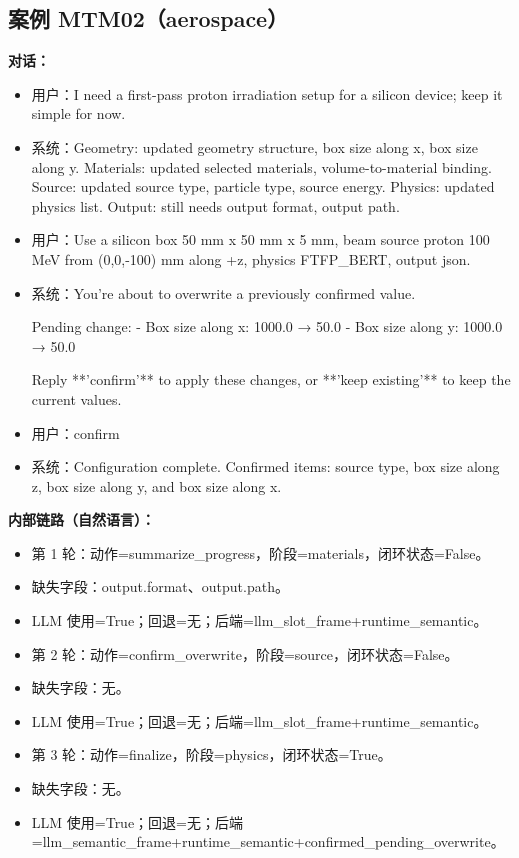 \documentclass[11pt]{ctexart}
\begin{document}
\subsection{案例 MTM02（aerospace）}
\textbf{对话：}
\begin{itemize}
\item 用户：I need a first-pass proton irradiation setup for a silicon device; keep it simple for now.
\item 系统：Geometry: updated geometry structure, box size along x, box size along y. Materials: updated selected materials, volume-to-material binding. Source: updated source type, particle type, source energy. Physics: updated physics list. Output: still needs output format, output path.
\item 用户：Use a silicon box 50 mm x 50 mm x 5 mm, beam source proton 100 MeV from (0,0,-100) mm along +z, physics FTFP\_BERT, output json.
\item 系统：You're about to overwrite a previously confirmed value.

Pending change:
- Box size along x: 1000.0 → 50.0
- Box size along y: 1000.0 → 50.0

Reply **'confirm'** to apply these changes, or **'keep existing'** to keep the current values.
\item 用户：confirm
\item 系统：Configuration complete. Confirmed items: source type, box size along z, box size along y, and box size along x.
\end{itemize}
\textbf{内部链路（自然语言）：}
\begin{itemize}
\item 第 1 轮：动作=summarize\_progress，阶段=materials，闭环状态=False。
\item 缺失字段：output.format、output.path。
\item LLM 使用=True；回退=无；后端=llm\_slot\_frame+runtime\_semantic。
\item 第 2 轮：动作=confirm\_overwrite，阶段=source，闭环状态=False。
\item 缺失字段：无。
\item LLM 使用=True；回退=无；后端=llm\_slot\_frame+runtime\_semantic。
\item 第 3 轮：动作=finalize，阶段=physics，闭环状态=True。
\item 缺失字段：无。
\item LLM 使用=True；回退=无；后端=llm\_semantic\_frame+runtime\_semantic+confirmed\_pending\_overwrite。
\end{itemize}
\end{document}
